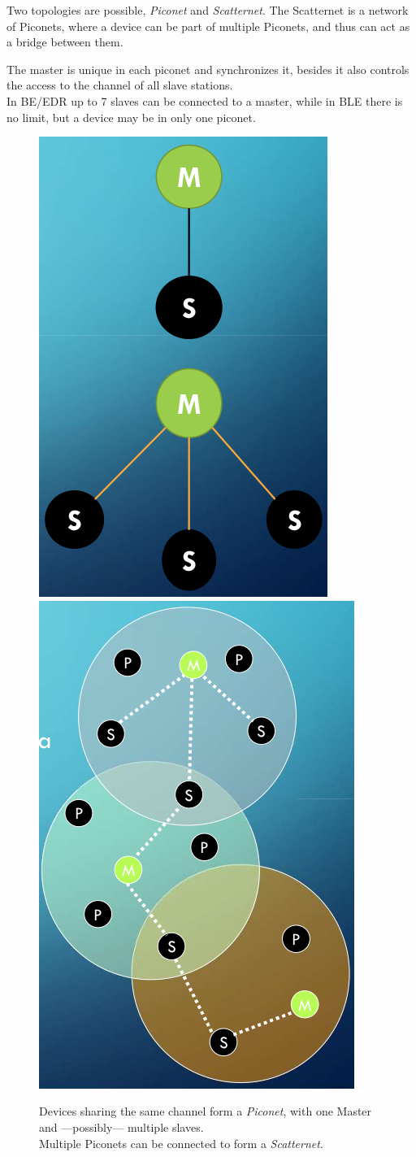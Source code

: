 \begin{paracol}{2}
   
   Two topologies are possible, \textit{Piconet} and \textit{Scatternet}.
   The Scatternet is a network of Piconets, where a device can be part of multiple Piconets, and thus can act as a bridge between them.

   The master is unique in each piconet and synchronizes it, besides it also controls the access to the channel of all slave stations.\\
   In BE/EDR up to 7 slaves can be connected to a master, while in BLE there is no limit, but a device may be in only one piconet.
   \switchcolumn
   \begin{figure}[htbp]
      \centering
      \includegraphics[width=0.45\columnwidth]{images/bluetooth_topology.png}
      \includegraphics[width=0.45\columnwidth]{images/bluetooth_scatternet.png}
      \caption{Devices sharing the same channel form a \textit{Piconet}, with one Master and ---possibly--- multiple slaves.\\
      Multiple Piconets can be connected to form a \textit{Scatternet}.}
      \label{fig:bluetooth_topology}
   \end{figure}
\end{paracol}

